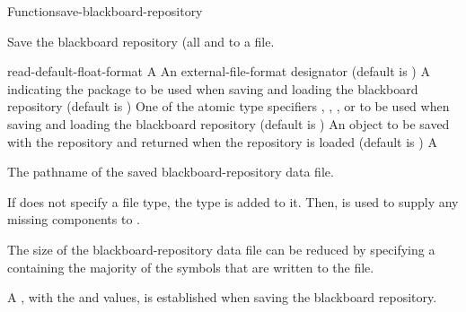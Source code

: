 \documentclass[10pt,twoside,english,pdftex]{article}
\begin{document}

\begin{functiondoc}{Function}{save-blackboard-repository}%
  {
      
    \returns{} }
%
% 

\fnsyntax 

\fnpurpose Save the blackboard repository (all  and
 to a file.

\fnpackage {}

\fnmodule {}

\fnargs
\begin{args}{read-default-float-format}
\arg[pathname] A 
 An external-file-format designator (default is
  )
\arg[package] A  indicating the package to be used
when saving and loading the blackboard repository (default is
)
 One of the atomic type specifiers
, ,
, or  to be used when saving
and loading the blackboard repository (default is )
\arg[value] An object to be saved with the repository and returned when the
repository is loaded (default is \nil)
 A 
\end{args}

\fnreturns The pathname of the saved blackboard-repository data file.

\fndescription If  does not specify a file type, the type
 is added to it.  Then,  is used
to supply any missing components to .

The size of the blackboard-repository data file can be reduced by specifying a
 containing the majority of the symbols that are written
to the file.

A , with the
 and  values, is
established when saving the blackboard repository.


\end{functiondoc}
\end{document}
